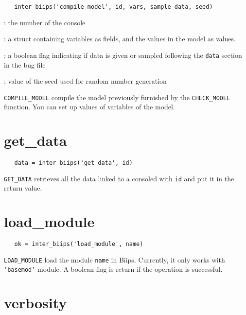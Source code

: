 \documentclass[11pt]{article}
\begin{document}
 \begin{lstlisting}
   inter_biips('compile_model', id, vars, sample_data, seed) 
 \end{lstlisting}
   \begin{description}
   \setlength{\baselineskip}{0.1\baselineskip}
     \item[\texttt{id}] : the number of the console
     \item[\texttt{vars}] : a struct containing variables as fields, and the values in the model as values.
     \item[\texttt{sample\_data}] : a boolean flag indicating if data is given or sampled following the \texttt{data} section in the bug file
     \item[\texttt{seed}] : value of the seed used for random number generation
   
   \end{description}

   \texttt{COMPILE\_MODEL} compile the model previously furnished by the \texttt{CHECK\_MODEL} function. You can set up values of variables of 
   the model.


\section{get\_data}
   
 \begin{lstlisting}
   data = inter_biips('get_data', id) 
 \end{lstlisting}
 
  \texttt{GET\_DATA} retrieves all the data linked to a consoled with \texttt{id} and put it in the return value.


\section{load\_module}
 
 \begin{lstlisting}
   ok = inter_biips('load_module', name)
 \end{lstlisting}

  \texttt{LOAD\_MODULE} load the module \texttt{name} in Biips. Currently, it only works with \texttt{'basemod'} module. A 
  boolean flag is return if the operation is successful.

\section{verbosity}
 
\end{document}
